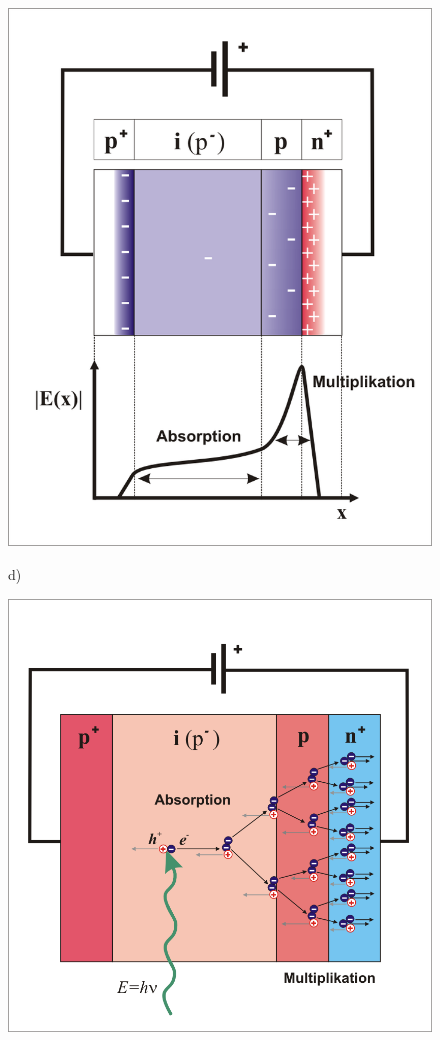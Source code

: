 \begin{figure}[tbh]
\begin{minipage}{.45\textwidth}
		\includegraphics[width=\linewidth]{./ImageFiles/APD2_German.png}
	\end{minipage}
	d)
	\begin{minipage}{.45\textwidth}
		\includegraphics[width=\linewidth]{./ImageFiles/APD3_German.png}

\end{minipage}
\end{figure}
